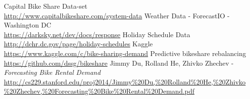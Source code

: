 \documentclass[journal, a4paper]{IEEEtran}
\begin{document}
\begin{thebibliography}{5}
    Capital Bike Share Data-set\\
    \url{http://www.capitalbikeshare.com/system-data}
    Weather Data - ForecastIO - Washington DC\\
    \url{https://darksky.net/dev/docs/response}
    Holiday Schedule Data\\
    \url{http://dchr.dc.gov/page/holiday-schedules}
    Kaggle\\
    \url{https://www.kaggle.com/c/bike-sharing-demand}
    Predictive bikeshare rebalancing\\
    \url{https://github.com/dssg/bikeshare}
    Jimmy Du, Rolland He, Zhivko Zhechev - \textit{Forecasting Bike Rental Demand}\\
    \url{http://cs229.stanford.edu/proj2014/Jimmy\%20Du,\%20Rolland\%20He,\%20Zhivko\%20Zhechev,\%20Forecasting\%20Bike\%20Rental\%20Demand.pdf}
\end{thebibliography}
\end{document}
